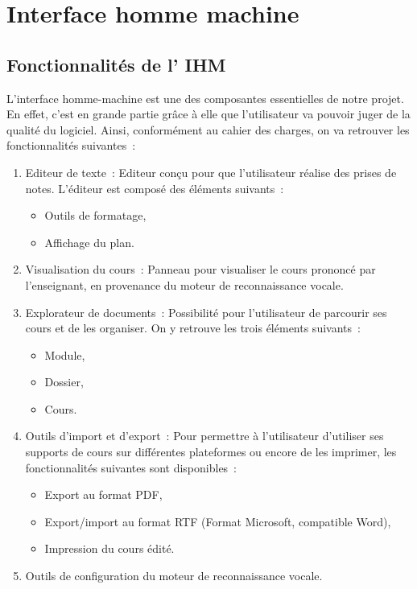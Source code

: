 
\chapter{Interface homme machine}
\minitoc

\section{Fonctionnalités de l' IHM}

L'interface homme-machine est une des composantes essentielles de notre projet.
En effet, c'est en grande partie grâce à elle que l'utilisateur va pouvoir juger de la qualité du logiciel.
Ainsi, conformément au cahier des charges, on va retrouver les fonctionnalités suivantes~:

\begin{enumerate}

\item Editeur de texte~: Editeur conçu pour que l'utilisateur réalise des prises de notes.
L'éditeur est composé des éléments suivants~:
\begin{itemize}
\item Outils de formatage,
\item Affichage du plan.
\end{itemize}
\item Visualisation du cours~: Panneau pour visualiser le cours prononcé par l'enseignant, en provenance du moteur de reconnaissance vocale.
\item Explorateur de documents~: Possibilité pour l'utilisateur de parcourir ses cours et de les organiser.
On y retrouve les trois éléments suivants~:
\begin{itemize}
\item Module,
\item Dossier,
\item Cours.
\end{itemize}
\item Outils d'import et d'export~: Pour permettre à l'utilisateur d'utiliser ses supports de cours sur différentes plateformes ou encore de les imprimer, les fonctionnalités suivantes sont disponibles~:
\begin{itemize}
\item Export au format PDF,
\item Export/import au format RTF (Format Microsoft, compatible Word),
\item Impression du cours édité.
\end{itemize} 
\item Outils de configuration du moteur de reconnaissance vocale.  
\end{enumerate}

